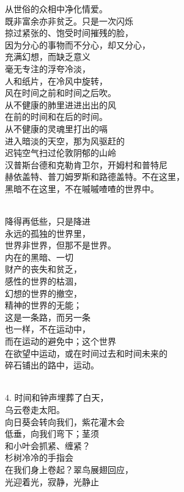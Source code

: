 \documentclass{article}
\begin{document}
从世俗的众相中净化情爱。\\
既非富余亦非贫乏。只是一次闪烁\\
掠过紧张的、饱受时间摧残的脸，\\
因为分心的事物而不分心，却又分心，\\
充满幻想，而缺乏意义\\
毫无专注的浮夸冷淡，\\
人和纸片，在冷风中旋转，\\
风在时间之前和时间之后吹。\\
从不健康的肺里进进出出的风\\
在前的时间和在后的时间。
\newpage
\\
从不健康的灵魂里打出的嗝\\
进入暗淡的天空，那为风驱赶的\\
迟钝空气扫过伦敦阴郁的山岭\\
汉普斯台德和克勒肯卫尔，开姆村和普特尼\\
赫依盖特、普刀姆罗斯和路德盖特。不在这里，\\
黑暗不在这里，不在嘁嘁喳喳的世界中。 \par \\
降得再低些，只是降进\\
永远的孤独的世界里，\\
世界非世界，但那不是世界。\\
内在的黑暗、一切\\
财产的丧失和贫乏，\\
感性的世界的枯涸，\\
幻想的世界的撤空，\\
精神的世界的无能；\\
这是一条路，而另一条\\
也一样，不在运动中，\\
而在运动的避免中；这个世界\\
在欲望中运动，或在时间过去和时间未来的\\
碎石铺出的路中，运动。 \par \\
4. 时间和钟声埋葬了白天，\\
乌云卷走太阳。
\newpage
\\
向日葵会转向我们，紫花灌木会\\
低垂，向我们弯下；茎须\\
和小叶会抓紧、缠紧？\\
杉树冷冷的手指会\\
在我们身上卷起？翠鸟展翅回应，\\
光迎着光，寂静，光静止\\
\end{document}
